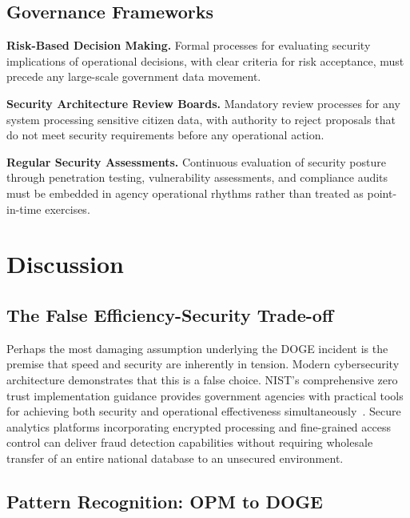 \documentclass[sigconf,nonacm]{acmart}
\begin{document}
\subsection{Governance Frameworks}

\textbf{Risk-Based Decision Making.} Formal processes for evaluating security
implications of operational decisions, with clear criteria for risk acceptance, must
precede any large-scale government data movement.

\textbf{Security Architecture Review Boards.} Mandatory review processes for any
system processing sensitive citizen data, with authority to reject proposals that do
not meet security requirements before any operational action.

\textbf{Regular Security Assessments.} Continuous evaluation of security posture
through penetration testing, vulnerability assessments, and compliance audits must be
embedded in agency operational rhythms rather than treated as point-in-time
exercises.

\section{Discussion}

\subsection{The False Efficiency-Security Trade-off}

Perhaps the most damaging assumption underlying the DOGE incident is the premise that
speed and security are inherently in tension. Modern cybersecurity architecture
demonstrates that this is a false choice. NIST's comprehensive zero trust implementation
guidance provides government agencies with practical tools for achieving both security
and operational effectiveness simultaneously~\cite{nist2021zt,nist180035}. Secure
analytics platforms incorporating encrypted processing and fine-grained access control
can deliver fraud detection capabilities without requiring wholesale transfer of an
entire national database to an unsecured environment.

\subsection{Pattern Recognition: OPM to DOGE}
\end{document}
